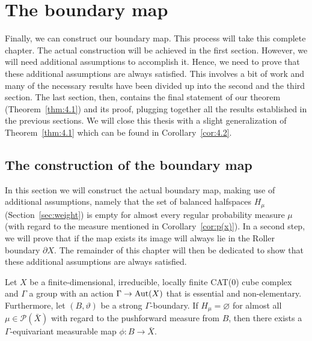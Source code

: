 \section{The boundary map}
\label{sec:map}

Finally, we can construct our boundary map. This process will take this complete chapter. The actual construction will be achieved in the first section. However, we will need additional assumptions to accomplish it. Hence, we need to prove that these additional assumptions are always satisfied. This involves a bit of work and many of the necessary results have been divided up into the second and the third section. The last section, then, contains the final statement of our theorem (Theorem~\ref{thm:4.1}) and its proof, plugging together all the results established in the previous sections. We will close this thesis with a slight generalization of Theorem~\ref{thm:4.1} which can be found in Corollary~\ref{cor:4.2}.

\subsection{The construction of the boundary map}
\label{sec:treminal-elements}
In this section we will construct the actual boundary map, making use of additional assumptions, namely that the set of balanced halfspaces \(H_\mu\) (Section~\ref{sec:weight}) is empty for almost every regular probability measure \(\mu\) (with regard to the measure mentioned in Corollary~\ref{cor:p(x)}). In a second step, we will prove that if the map exists its image will always lie in the Roller boundary \(\partial X\). The remainder of this chapter will then be dedicated to show that these additional assumptions are always satisfied.

\begin{lemma}
  \label{lem:H=0}
  Let \(X\) be a finite-dimensional, irreducible, locally finite CAT(0) cube complex and \(\Gamma\) a group with an action \(\Gamma \to \operatorname{Aut}(X)\) that is essential and non-elementary. Furthermore, let \((B, \vartheta)\) be a strong \(\Gamma\)-boundary. If \(H_\mu = \varnothing\) for almost all \(\mu \in \mathcal{P}(\bar X)\) with regard to the pushforward measure from \(B\), then there exists a \(\Gamma\)-equivariant measurable map \(\phi\colon B \to \bar X\).
\end{lemma}

